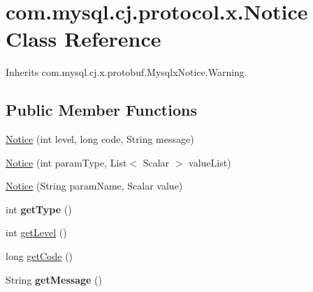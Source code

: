 \hypertarget{classcom_1_1mysql_1_1cj_1_1protocol_1_1x_1_1_notice}{}\section{com.\+mysql.\+cj.\+protocol.\+x.\+Notice Class Reference}
\label{classcom_1_1mysql_1_1cj_1_1protocol_1_1x_1_1_notice}


Inherits com.\+mysql.\+cj.\+x.\+protobuf.\+Mysqlx\+Notice.\+Warning.

\subsection*{Public Member Functions}
\begin{DoxyCompactItemize}
\item 
\mbox{\hyperlink{classcom_1_1mysql_1_1cj_1_1protocol_1_1x_1_1_notice_a393f2c56e3f27bd7886c20c5d0b112c6}{Notice}} (int level, long code, String message)
\item 
\mbox{\hyperlink{classcom_1_1mysql_1_1cj_1_1protocol_1_1x_1_1_notice_a04ad1c9c83f266ad5912c6a641bc500d}{Notice}} (int param\+Type, List$<$ Scalar $>$ value\+List)
\item 
\mbox{\hyperlink{classcom_1_1mysql_1_1cj_1_1protocol_1_1x_1_1_notice_aef110aa59a1ea329f80bbe1517fe348f}{Notice}} (String param\+Name, Scalar value)
\item 
\mbox{\label{classcom_1_1mysql_1_1cj_1_1protocol_1_1x_1_1_notice_a2e5d7dedbf19dc70b55dddb689af5c86}} 
int {\bfseries get\+Type} ()
\item 
int \mbox{\hyperlink{classcom_1_1mysql_1_1cj_1_1protocol_1_1x_1_1_notice_adfa9327778b49a0e05d9a9620263e622}{get\+Level}} ()
\item 
long \mbox{\hyperlink{classcom_1_1mysql_1_1cj_1_1protocol_1_1x_1_1_notice_aa2a4395f9869d4d04470a233eefcb79f}{get\+Code}} ()
\item 
\mbox{\label{classcom_1_1mysql_1_1cj_1_1protocol_1_1x_1_1_notice_a6ffea4ce470da852b49bef0feccf7cf4}} 
String {\bfseries get\+Message} ()
\item 
\mbox{\label{classcom_1_1mysql_1_1cj_1_1protocol_1_1x_1_1_notice_a5ec4ac9d0211206e6862177172ab5f72}} 

\end{DoxyCompactItemize}
